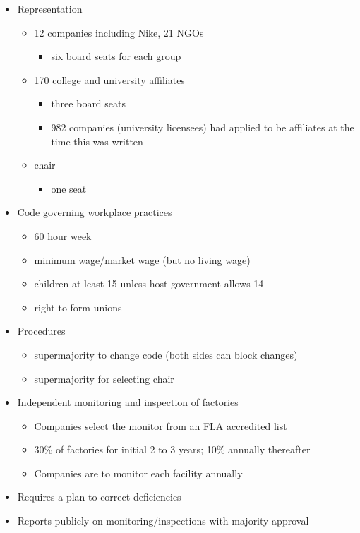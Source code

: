 \documentclass[
  12pt,
]{article}
\providecommand{\tightlist}{%
  \setlength{\itemsep}{0pt}\setlength{\parskip}{0pt}}
\begin{document}
\begin{itemize}
\tightlist
\item
  Representation

  \begin{itemize}
  \tightlist
  \item
    12 companies including Nike, 21 NGOs

    \begin{itemize}
    \tightlist
    \item
      six board seats for each group
    \end{itemize}
  \item
    170 college and university affiliates

    \begin{itemize}
    \tightlist
    \item
      three board seats
    \item
      982 companies (university licensees) had applied to be affiliates
      at the time this was written
    \end{itemize}
  \item
    chair

    \begin{itemize}
    \tightlist
    \item
      one seat
    \end{itemize}
  \end{itemize}
\item
  Code governing workplace practices

  \begin{itemize}
  \tightlist
  \item
    60 hour week
  \item
    minimum wage/market wage (but no living wage)
  \item
    children at least 15 unless host government allows 14
  \item
    right to form unions
  \end{itemize}
\item
  Procedures

  \begin{itemize}
  \tightlist
  \item
    supermajority to change code (both sides can block changes)
  \item
    supermajority for selecting chair
  \end{itemize}
\item
  Independent monitoring and inspection of factories

  \begin{itemize}
  \tightlist
  \item
    Companies select the monitor from an FLA accredited list
  \item
    30\% of factories for initial 2 to 3 years; 10\% annually thereafter
  \item
    Companies are to monitor each facility annually
  \end{itemize}
\item
  Requires a plan to correct deficiencies
\item
  Reports publicly on monitoring/inspections with majority approval
\end{itemize}
\end{document}
